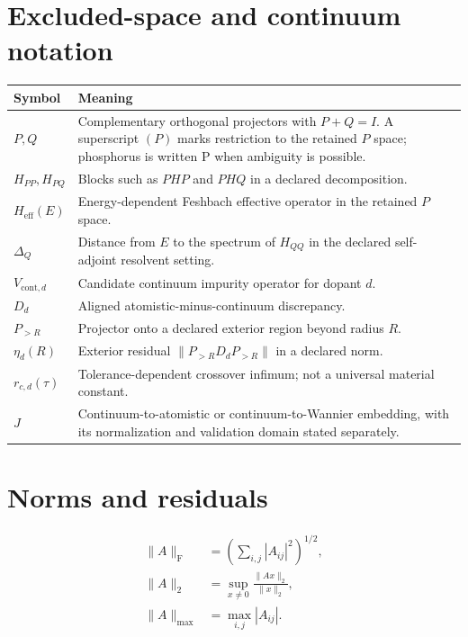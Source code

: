\section{Excluded-space and continuum notation}

\begin{center}
\small
\begin{tabular}{@{}p{}p{}@{}}
\toprule
Symbol & Meaning \\
\midrule
$P,Q$ & Complementary orthogonal projectors with $P+Q=I$. A superscript $(P)$
marks restriction to the retained $P$ space; phosphorus is written $\mathrm P$
when ambiguity is possible. \\
$H_{PP},H_{PQ}$ & Blocks such as $PHP$ and $PHQ$ in a declared decomposition. \\
$H_{\mathrm{eff}}(E)$ & Energy-dependent Feshbach effective operator in the
retained $P$ space. \\
$\Delta_Q$ & Distance from $E$ to the spectrum of $H_{QQ}$ in the declared
self-adjoint resolvent setting. \\
$V_{\mathrm{cont},d}$ & Candidate continuum impurity operator for dopant $d$. \\
$D_d$ & Aligned atomistic-minus-continuum discrepancy. \\
$P_{>R}$ & Projector onto a declared exterior region beyond radius $R$. \\
$\eta_d(R)$ & Exterior residual $\|P_{>R}D_dP_{>R}\|$ in a declared norm. \\
$r_{c,d}(\tau)$ & Tolerance-dependent crossover infimum; not a universal
material constant. \\
$J$ & Continuum-to-atomistic or continuum-to-Wannier embedding, with its
normalization and validation domain stated separately. \\
\bottomrule
\end{tabular}
\end{center}


\section{Norms and residuals}


\begin{align}
  \|A\|_{\mathrm F}
  &=
  \left(\sum_{i,j}|A_{ij}|^2\right)^{1/2},\\
  \|A\|_2
  &=
  \sup_{x\ne0}\frac{\|Ax\|_2}{\|x\|_2},\\
  \|A\|_{\max}
  &=
  \max_{i,j}|A_{ij}|.
\end{align}

